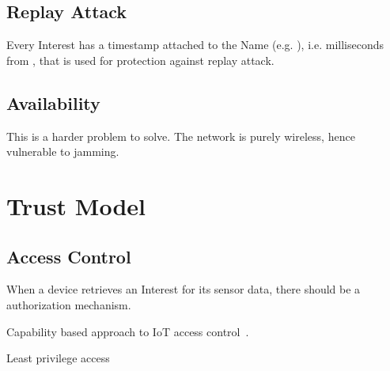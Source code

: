 \subsection{Replay Attack}
Every Interest has a timestamp attached to the Name (e.g. ), i.e. milliseconds from , that is used for protection against replay attack. 


\subsection{Availability}

This is a harder problem to solve.
The network is purely wireless, hence vulnerable to jamming. 

\section{Trust Model}


\subsection{Access Control}\label{access_control}

When a device retrieves an Interest for its sensor data, there should be a authorization mechanism. 

Capability based approach to \gls{IoT} access control~\cite{DBLP:conf/imis/GusmeroliPR12}.

Least privilege access